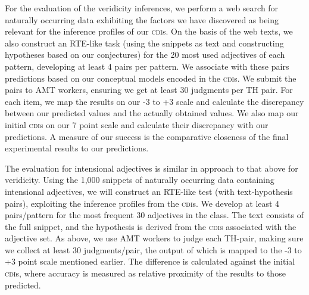 \documentclass[10pt]{article}
\begin{document}
For the evaluation of the veridicity inferences, we perform  a web search for naturally occurring data exhibiting the factors we have discovered as being relevant for the inference profiles of our \textsc{cdi}s. On the basis of the web texts, we also construct an RTE-like task (using the snippets as {\sc text} and constructing {\sc hypotheses} based on our conjectures) for the 20 most used adjectives of each pattern, developing at least 4 pairs per pattern. We associate with these pairs predictions based on our conceptual models encoded in the \textsc{cdi}s. We submit the pairs to AMT workers, ensuring we get at least 30 judgments per TH pair. For each item, we map the results on our -3 to +3 scale and calculate the discrepancy between our predicted values and the actually obtained values. We also map our initial \textsc{cdi}s on our 7 point scale and calculate their discrepancy with our predictions. A measure of our success is the comparative closeness of the final experimental results to our predictions. 


The evaluation for intensional adjectives is similar in approach to that above for  veridicity. 
Using the 1,000 snippets of naturally occurring data containing intensional adjectives, we will construct an RTE-like test (with {\sc text}-{\sc hypothesis} pairs), exploiting the inference profiles from the \textsc{cdi}s. We develop at least 4 pairs/pattern for the most frequent 30 adjectives in the class. 
The  {\sc text} consists of the full snippet, and the {\sc hypothesis} is derived from the \textsc{cdi}s associated with the adjective set. 
As above, we use AMT workers to judge each TH-pair, making sure we
collect at least 30 judgments/pair, the output of which is mapped to
the -3 to +3 point scale mentioned earlier. The difference is
calculated against the initial \textsc{cdi}s, where accuracy is measured
as relative proximity of the results  to those predicted. 
%

\end{document}
